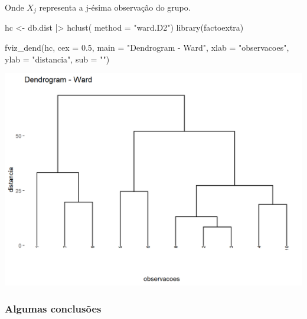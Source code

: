 \documentclass[
  letterpaper,
  DIV=11,
  numbers=noendperiod]{scrreprt}
\newenvironment{Shaded}{\begin{snugshade}}{\end{snugshade}}
\newcommand{\AttributeTok}[1]{\textcolor[rgb]{0.40,0.45,0.13}{#1}}
\newcommand{\FloatTok}[1]{\textcolor[rgb]{0.68,0.00,0.00}{#1}}
\newcommand{\FunctionTok}[1]{\textcolor[rgb]{0.28,0.35,0.67}{#1}}
\newcommand{\NormalTok}[1]{\textcolor[rgb]{0.00,0.23,0.31}{#1}}
\newcommand{\OtherTok}[1]{\textcolor[rgb]{0.00,0.23,0.31}{#1}}
\newcommand{\SpecialCharTok}[1]{\textcolor[rgb]{0.37,0.37,0.37}{#1}}
\newcommand{\StringTok}[1]{\textcolor[rgb]{0.13,0.47,0.30}{#1}}
\begin{document}
Onde \(X_j\) representa a j-ésima observação do grupo.

\begin{Shaded}
\begin{Highlighting}[]
\NormalTok{hc }\OtherTok{\textless{}{-}}\NormalTok{  db.dist }\SpecialCharTok{|\textgreater{}} 
  \FunctionTok{hclust}\NormalTok{( }\AttributeTok{method =} \StringTok{"ward.D2"}\NormalTok{) }
\FunctionTok{library}\NormalTok{(factoextra)}
\end{Highlighting}
\end{Shaded}

\begin{Shaded}
\begin{Highlighting}[]
\FunctionTok{fviz\_dend}\NormalTok{(hc, }\AttributeTok{cex =} \FloatTok{0.5}\NormalTok{,}
          \AttributeTok{main =} \StringTok{"Dendrogram {-} Ward"}\NormalTok{,}
          \AttributeTok{xlab =} \StringTok{"observacoes"}\NormalTok{, }\AttributeTok{ylab =} \StringTok{"distancia"}\NormalTok{, }\AttributeTok{sub =} \StringTok{""}\NormalTok{)}
\end{Highlighting}
\end{Shaded}

\includegraphics{./figuras_naosupervisionado/unnamed-chunk-10-1.png}

\hypertarget{algumas-conclusuxf5es}{%
\subsubsection{Algumas conclusões}\label{algumas-conclusuxf5es}}
\end{document}
